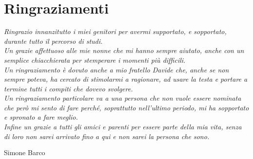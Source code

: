 
\cleardoublepage
{}
\begingroup
\let\clearpage\relax
\let\cleardoublepage\relax
\let\cleardoublepage\relax

\newpage
\thispagestyle{empty}

\thispagestyle{empty}
\chapter*{Ringraziamenti}
\textit{Ringrazio innanzitutto i miei genitori per avermi supportato, e sopportato, durante tutto il percorso di studi.\\
Un grazie affettuoso alle mie nonne che mi hanno sempre aiutato, anche con un semplice chiacchierata per stemperare i momenti più difficili.\\
Un ringraziamento è dovuto anche a mio fratello Davide che, anche se non sempre poteva, ha cercato di stimolarmi a ragionare, ad usare la testa e portare a termine tutti i compiti che dovevo svolgere.\\
Un ringraziamento particolare va a una persona che non vuole essere nominata che però mi sento di fare perché, soprattutto nell'ultimo periodo, mi ha sopportato e spronato a fare meglio.\\
Infine un grazie a tutti gli amici e parenti per essere parte della mia vita, senza di loro non sarei arrivato fino a qui e non sarei la persona che sono.}
\begin{flushright}
  Simone Barco
\end{flushright}


%
%
\newpage
\null
\thispagestyle{empty}
\newpage
